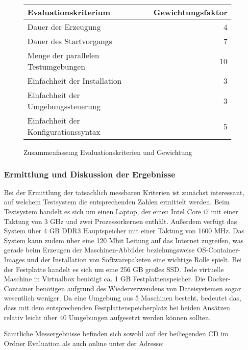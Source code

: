 \begin{figure}[!ht]
  \begin{center}
    \resizebox{15cm}{!} {
      \begin{tabular}{|l|r|}
      \hline
      Evaluationskriterium & Gewichtungsfaktor \\
      \hline
      Dauer der Erzeugung & 4 \\
      \hline
      Dauer des Startvorgangs & 7 \\
      \hline
      Menge der parallelen Testumgebungen & 10 \\
      \hline
      Einfachheit der Installation & 3 \\
      \hline
      Einfachheit der Umgebungssteuerung & 3 \\      
      \hline
      Einfachheit der Konfigurationssyntax & 5 \\
      \hline
      \end{tabular}
    }
    \caption{Zusammenfassung Evaluationskriterien und Gewichtung}
    \label{kriterien}
  \end{center}
\end{figure}

\subsubsection{Ermittlung und Diskussion der Ergebnisse}

Bei der Ermittlung der tatsächlich messbaren Kriterien ist zunächst interessant, auf welchem Testsystem die entsprechenden Zahlen ermittelt werden. Beim Testsystem handelt es sich um einen Laptop, der einen Intel Core i7 mit einer Taktung von 3 GHz und zwei Prozessorkernen enthält. Außerdem verfügt das System über 4 GB DDR3 Hauptspeicher mit einer Taktung von 1600 MHz. Das System kann zudem über eine 120 Mbit Leitung auf das Internet zugreifen, was gerade beim Erzeugen der Maschinen-Abbilder beziehungsweise OS-Container-Images und der Installation von Softwarepaketen eine wichtige Rolle spielt. Bei der Festplatte handelt es sich um eine 256 GB großes \ac{SSD}. Jede virtuelle Maschine in Virtualbox benötigt ca. 1 GB Festplattenspeicher. Die Docker-Container benötigen aufgrund des Wiederverwendens von Dateisystemen sogar wesentlich weniger. Da eine Umgebung aus 5 Maschinen besteht, bedeutet das, dass mit dem entsprechenden Festplattenspeicherplatz bei beiden Ansätzen relativ leicht über 40 Umgebungen aufgesetzt werden können sollten.

Sämtliche Messergebnisse befinden sich sowohl auf der beiliegenden CD im Ordner Evaluation als auch online unter der Adresse:

